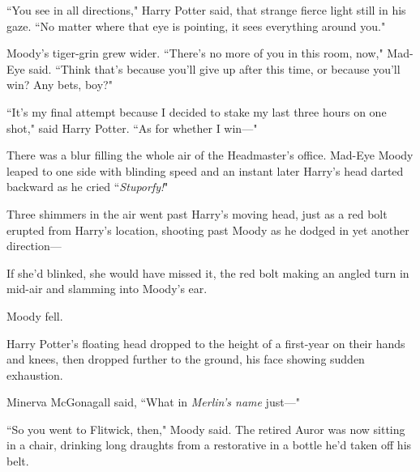 ``You see in all directions," Harry Potter said, that strange fierce light still in his gaze. ``No matter where that eye is pointing, it sees everything around you."

Moody's tiger-grin grew wider. ``There's no more of you in this room, now," Mad-Eye said. ``Think that's because you'll give up after this time, or because you'll win? Any bets, boy?"

``It's my final attempt because I decided to stake my last three hours on one shot," said Harry Potter. ``As for whether I win—"

There was a blur filling the whole air of the Headmaster's office. Mad-Eye Moody leaped to one side with blinding speed and an instant later Harry's head darted backward as he cried ``\emph{Stuporfy!}"

Three shimmers in the air went past Harry's moving head, just as a red bolt erupted from Harry's location, shooting past Moody as he dodged in yet another direction—

If she'd blinked, she would have missed it, the red bolt making an angled turn in mid-air and slamming into Moody's ear.

Moody fell.

Harry Potter's floating head dropped to the height of a first-year on their hands and knees, then dropped further to the ground, his face showing sudden exhaustion.

Minerva McGonagall said, ``What in \emph{Merlin's name} just—"

\later

``So you went to Flitwick, then," Moody said. The retired Auror was now sitting in a chair, drinking long draughts from a restorative in a bottle he'd taken off his belt.

